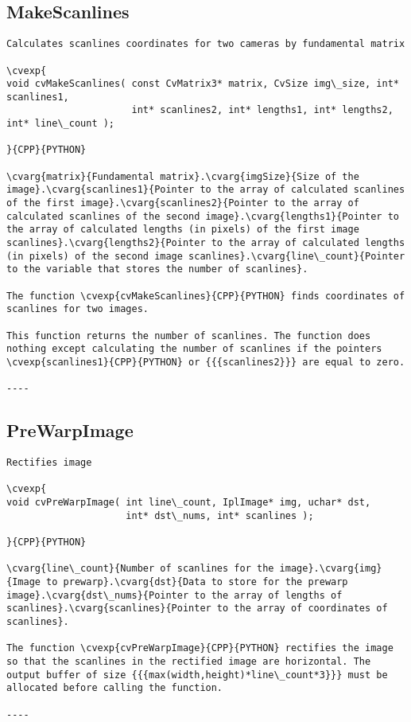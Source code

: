\subsection{MakeScanlines}
\begin{verbatim}
Calculates scanlines coordinates for two cameras by fundamental matrix

\cvexp{
void cvMakeScanlines( const CvMatrix3* matrix, CvSize img\_size, int* scanlines1,
                      int* scanlines2, int* lengths1, int* lengths2, int* line\_count );

}{CPP}{PYTHON}

\cvarg{matrix}{Fundamental matrix}.\cvarg{imgSize}{Size of the image}.\cvarg{scanlines1}{Pointer to the array of calculated scanlines of the first image}.\cvarg{scanlines2}{Pointer to the array of calculated scanlines of the second image}.\cvarg{lengths1}{Pointer to the array of calculated lengths (in pixels) of the first image scanlines}.\cvarg{lengths2}{Pointer to the array of calculated lengths (in pixels) of the second image scanlines}.\cvarg{line\_count}{Pointer to the variable that stores the number of scanlines}.

The function \cvexp{cvMakeScanlines}{CPP}{PYTHON} finds coordinates of scanlines for two images.

This function returns the number of scanlines. The function does nothing except calculating the number of scanlines if the pointers \cvexp{scanlines1}{CPP}{PYTHON} or {{{scanlines2}}} are equal to zero.

----
\end{verbatim}
\subsection{PreWarpImage}
\begin{verbatim}
Rectifies image

\cvexp{
void cvPreWarpImage( int line\_count, IplImage* img, uchar* dst,
                     int* dst\_nums, int* scanlines );

}{CPP}{PYTHON}

\cvarg{line\_count}{Number of scanlines for the image}.\cvarg{img}{Image to prewarp}.\cvarg{dst}{Data to store for the prewarp image}.\cvarg{dst\_nums}{Pointer to the array of lengths of scanlines}.\cvarg{scanlines}{Pointer to the array of coordinates of scanlines}.

The function \cvexp{cvPreWarpImage}{CPP}{PYTHON} rectifies the image so that the scanlines in the rectified image are horizontal. The output buffer of size {{{max(width,height)*line\_count*3}}} must be allocated before calling the function.

----
\end{verbatim}
